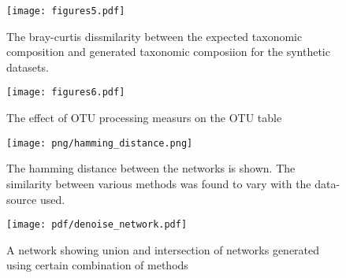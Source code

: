 \begin{figure}[h]
  \centering
  \texttt{[image: figures5.pdf]}
  \caption{
    The bray-curtis dissmilarity between the expected taxonomic composition and generated taxonomic composiion for the synthetic datasets.
}
  \label{fig:figures4}
\end{figure}

\begin{figure}[h]
  \centering
  \texttt{[image: figures6.pdf]}
  \caption{
    The effect of OTU processing measurs on the OTU table
}
  \label{fig:figures4}
\end{figure}

\begin{figure}[h]
  \centering
  \texttt{[image: png/hamming\_distance.png]}
  \caption{The hamming distance between the networks is shown. The similarity between various methods was found to vary with the data-source used.}
  \label{fig:figures4}
\end{figure}

\begin{figure}[h]
  \centering
  \texttt{[image: pdf/denoise\_network.pdf]}
  \caption{A network showing union and intersection of networks generated using certain combination of methods}
  \label{fig:figures5}
\end{figure}



